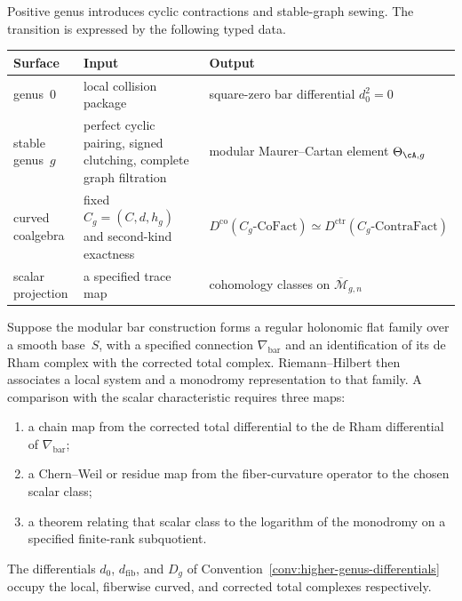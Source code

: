 Positive genus introduces cyclic contractions and stable-graph
sewing.  The transition is expressed by the following typed data.

\begin{center}
\small
\renewcommand{\arraystretch}{1.3}
\begin{tabular}{p{3.5cm}p{4.0cm}p{4.0cm}}
\textbf{Surface} & \textbf{Input} & \textbf{Output} \\
\hline
genus~$0$ & local collision package & square-zero bar differential
$d_0^2=0$ \\[2pt]
stable genus~$g$ & perfect cyclic pairing, signed clutching, complete
graph filtration & modular Maurer--Cartan element
$\Theta_{\cA,g}$ \\[2pt]
curved coalgebra & fixed $C_g=(C,d,h_g)$ and second-kind exactness &
$D^{\mathrm{co}}(C_g\text{-}\mathrm{CoFact})\simeq
D^{\mathrm{ctr}}(C_g\text{-}\mathrm{ContraFact})$ \\[2pt]
scalar projection & a specified trace map & cohomology classes on
$\overline{\mathcal M}_{g,n}$
\end{tabular}
\end{center}

\begin{remark}
\label{rem:chiral-rh-revisited}
Suppose the modular bar construction forms a regular holonomic flat
family over a smooth base~$S$, with a specified connection
$\nabla_{\mathrm{bar}}$ and an identification of its de Rham complex
with the corrected total complex.  Riemann--Hilbert then associates a
local system and a monodromy representation to that family.  A
comparison with the scalar characteristic requires three maps:
\begin{enumerate}[label=(\roman*)]
\item a chain map from the corrected total differential to the de
Rham differential of $\nabla_{\mathrm{bar}}$;
\item a Chern--Weil or residue map from the fiber-curvature operator to
the chosen scalar class;
\item a theorem relating that scalar class to the logarithm of the
monodromy on a specified finite-rank subquotient.
\end{enumerate}
The differentials $d_0$, $d_{\mathrm{fib}}$, and $D_g$ of
Convention~\ref{conv:higher-genus-differentials} occupy the local,
fiberwise curved, and corrected total complexes respectively.
\end{remark}

